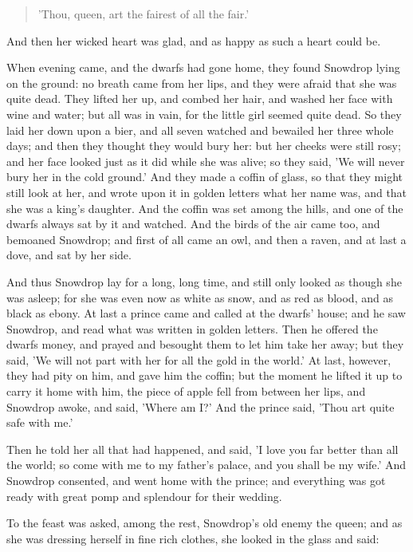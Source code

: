 \documentclass[12pt]{book}
\begin{document}
\begin{verse}
 'Thou, queen, art the fairest of all the fair.'
\end{verse}

And then her wicked heart was glad, and as happy as such a heart could
be.

When evening came, and the dwarfs had gone home, they found Snowdrop
lying on the ground: no breath came from her lips, and they were
afraid that she was quite dead. They lifted her up, and combed her
hair, and washed her face with wine and water; but all was in vain,
for the little girl seemed quite dead. So they laid her down upon a
bier, and all seven watched and bewailed her three whole days; and
then they thought they would bury her: but her cheeks were still rosy;
and her face looked just as it did while she was alive; so they said,
'We will never bury her in the cold ground.' And they made a coffin of
glass, so that they might still look at her, and wrote upon it in
golden letters what her name was, and that she was a king's daughter.
And the coffin was set among the hills, and one of the dwarfs always
sat by it and watched. And the birds of the air came too, and bemoaned
Snowdrop; and first of all came an owl, and then a raven, and at last
a dove, and sat by her side.

And thus Snowdrop lay for a long, long time, and still only looked as
though she was asleep; for she was even now as white as snow, and as
red as blood, and as black as ebony. At last a prince came and called
at the dwarfs' house; and he saw Snowdrop, and read what was written
in golden letters. Then he offered the dwarfs money, and prayed and
besought them to let him take her away; but they said, 'We will not
part with her for all the gold in the world.' At last, however, they
had pity on him, and gave him the coffin; but the moment he lifted it
up to carry it home with him, the piece of apple fell from between her
lips, and Snowdrop awoke, and said, 'Where am I?' And the prince said,
'Thou art quite safe with me.'

Then he told her all that had happened, and said, 'I love you far
better than all the world; so come with me to my father's palace, and
you shall be my wife.' And Snowdrop consented, and went home with the
prince; and everything was got ready with great pomp and splendour for
their wedding.

To the feast was asked, among the rest, Snowdrop's old enemy the
queen; and as she was dressing herself in fine rich clothes, she
looked in the glass and said:
\end{document}
